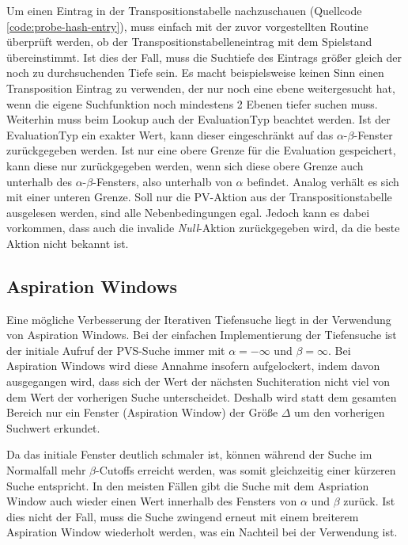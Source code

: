 Um einen Eintrag in der Transpositionstabelle nachzuschauen (Quellcode \ref{code:probe-hash-entry}), muss einfach mit der zuvor vorgestellten Routine überprüft werden, ob der Transpositionstabelleneintrag mit dem Spielstand übereinstimmt. Ist dies der Fall, muss die Suchtiefe des Eintrags größer gleich der noch zu durchsuchenden Tiefe sein. Es macht beispielsweise keinen Sinn einen Transposition Eintrag zu verwenden, der nur noch eine ebene weitergesucht hat, wenn die eigene Suchfunktion noch mindestens 2 Ebenen tiefer suchen muss. Weiterhin muss beim Lookup auch der EvaluationTyp beachtet werden. Ist der EvaluationTyp ein exakter Wert, kann dieser eingeschränkt auf das $\alpha$-$\beta$-Fenster zurückgegeben werden. Ist nur eine obere Grenze für die Evaluation gespeichert, kann diese nur zurückgegeben werden, wenn sich diese obere Grenze auch unterhalb des $\alpha$-$\beta$-Fensters, also unterhalb von $\alpha$ befindet. Analog verhält es sich mit einer unteren Grenze. Soll nur die \ac{PV}-Aktion aus der Transpositionstabelle ausgelesen werden, sind alle Nebenbedingungen egal. Jedoch kann es dabei vorkommen, dass auch die invalide \emph{Null}-Aktion zurückgegeben wird, da die beste Aktion nicht bekannt ist.

\pagebreak



\pagebreak

\subsection{Aspiration Windows}

Eine mögliche Verbesserung der Iterativen Tiefensuche liegt in der Verwendung von Aspiration Windows. Bei der einfachen Implementierung der Tiefensuche ist der initiale Aufruf der \ac{PVS}-Suche immer mit $\alpha = -\infty$ und $\beta = \infty$. Bei Aspiration Windows wird diese Annahme insofern aufgelockert, indem davon ausgegangen wird, dass sich der Wert der nächsten Suchiteration nicht viel von dem Wert der vorherigen Suche unterscheidet. Deshalb wird statt dem gesamten Bereich nur ein Fenster (Aspiration Window) der Größe $\Delta$ um den vorherigen Suchwert erkundet. \cite{2003.AspirationWindows}

Da das initiale Fenster deutlich schmaler ist, können während der Suche im Normalfall mehr $\beta$-Cutoffs erreicht werden, was somit gleichzeitig einer kürzeren Suche entspricht. In den meisten Fällen gibt die Suche mit dem Aspriation Window auch wieder einen Wert innerhalb des Fensters von $\alpha$ und $\beta$ zurück. Ist dies nicht der Fall, muss die Suche zwingend erneut mit einem breiterem Aspiration Window wiederholt werden, was ein Nachteil bei der Verwendung ist.

